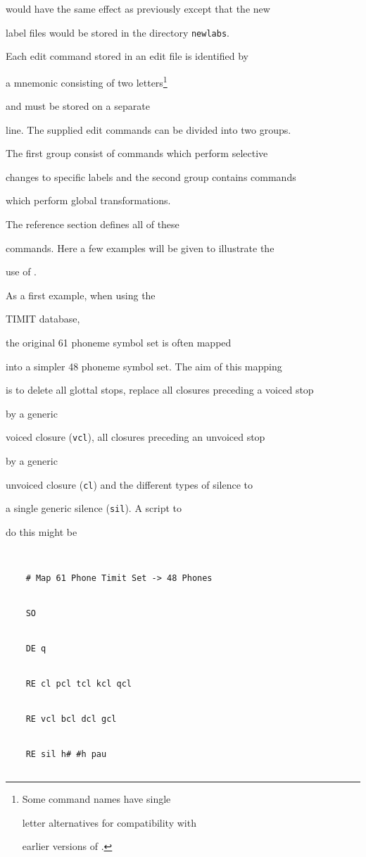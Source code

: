 would have the same effect as previously except that the new


label files would be stored in the directory \texttt{newlabs}.





Each edit command stored in an edit file is identified by


a mnemonic consisting of two letters\footnote{


Some command names have single 


letter alternatives for compatibility with


earlier versions of \HTK.}


and must be stored on a separate


line.  The supplied edit commands can be divided into two groups.


The first group consist of commands which perform selective 


changes to specific labels and the second group contains commands


which perform global transformations.  


The reference section defines all of these


commands.  Here a few examples will be given to illustrate the


use of .





As a first example, when using the 


TIMIT database,  


the original 61 phoneme symbol set is often mapped


into a simpler 48 phoneme symbol set.  The aim of this mapping


is to delete all glottal stops, replace all closures preceding a voiced stop 


by a generic


voiced closure (\texttt{vcl}), all closures preceding an unvoiced stop 


by a generic


unvoiced closure (\texttt{cl}) and the different types of silence to


a single generic silence (\texttt{sil}).  A  script to


do this might be


\begin{verbatim}


    # Map 61 Phone Timit Set -> 48 Phones


    SO


    DE q


    RE cl pcl tcl kcl qcl


    RE vcl bcl dcl gcl


    RE sil h# #h pau


\end{verbatim}



